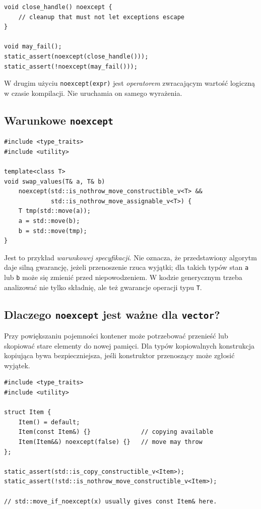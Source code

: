 \begin{lstlisting}
void close_handle() noexcept {
    // cleanup that must not let exceptions escape
}

void may_fail();
static_assert(noexcept(close_handle()));
static_assert(!noexcept(may_fail()));
\end{lstlisting}

W drugim użyciu \texttt{noexcept(expr)} jest \emph{operatorem}
zwracającym wartość logiczną w czasie kompilacji. Nie uruchamia on
samego wyrażenia.

\subsection{Warunkowe \texttt{noexcept}}

\begin{lstlisting}
#include <type_traits>
#include <utility>

template<class T>
void swap_values(T& a, T& b)
    noexcept(std::is_nothrow_move_constructible_v<T> &&
             std::is_nothrow_move_assignable_v<T>) {
    T tmp(std::move(a));
    a = std::move(b);
    b = std::move(tmp);
}
\end{lstlisting}

Jest to przykład \emph{warunkowej specyfikacji}. Nie oznacza,
że przedstawiony algorytm daje silną gwarancję, jeżeli przenoszenie
rzuca wyjątki; dla takich typów stan \texttt{a} lub \texttt{b} może
się zmienić przed niepowodzeniem. W kodzie generycznym trzeba
analizować nie tylko składnię, ale też gwarancje operacji typu \texttt{T}.

\subsection{Dlaczego \texttt{noexcept} jest ważne dla \texttt{vector}?}

Przy powiększaniu pojemności kontener może potrzebować przenieść
lub skopiować stare elementy do nowej pamięci. Dla typów kopiowalnych
konstrukcja kopiująca bywa bezpieczniejsza, jeśli konstruktor
przenoszący może zgłosić wyjątek.

\begin{lstlisting}
#include <type_traits>
#include <utility>

struct Item {
    Item() = default;
    Item(const Item&) {}              // copying available
    Item(Item&&) noexcept(false) {}   // move may throw
};

static_assert(std::is_copy_constructible_v<Item>);
static_assert(!std::is_nothrow_move_constructible_v<Item>);

// std::move_if_noexcept(x) usually gives const Item& here.
\end{lstlisting}

